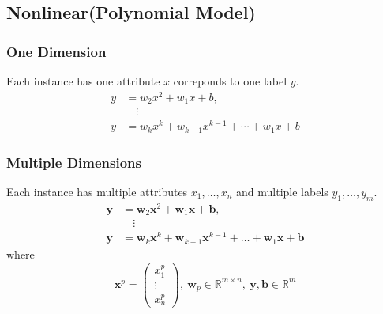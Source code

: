 \documentclass[../main.tex]{subfiles}
\begin{document}
        \subsection{Nonlinear(Polynomial Model)}
            \subsubsection{One Dimension}
                Each instance has one attribute $x$ correponds to one label $y$.
                \begin{align*}
                    y&=w_2x^2+w_1x+b, \\
                    &\quad \vdots\\
                    y&=w_kx^k+w_{k-1}x^{k-1}+\cdots+w_1x+b
                \end{align*}
            \subsubsection{Multiple Dimensions}
                Each instance has multiple attributes $x_1,\dots,x_n$ and multiple labels $y_1,\dots,y_m$.
                \begin{align*}
                    \boldsymbol{y}&=\boldsymbol{w}_2\boldsymbol{x}^2+\boldsymbol{w}_1\boldsymbol{x}+\boldsymbol{b}, \\
                    &\quad \vdots\\
                    \boldsymbol{y}&=\boldsymbol{w}_k\boldsymbol{x}^k+\boldsymbol{w}_{k-1}\boldsymbol{x}^{k-1}+\dots+\boldsymbol{w}_1\boldsymbol{x}+\boldsymbol{b}
                \end{align*}
            where
                \[
                    \boldsymbol{x}^p=\left(\begin{array}{c}
                        x_1^p\\
                        \vdots\\
                        x_n^p
                    \end{array}\right),~
                    \boldsymbol{w}_p \in \mathbb{R}^{m \times n},~
                    \boldsymbol{y}, \boldsymbol{b} \in \mathbb{R}^m
                \]
\end{document}
